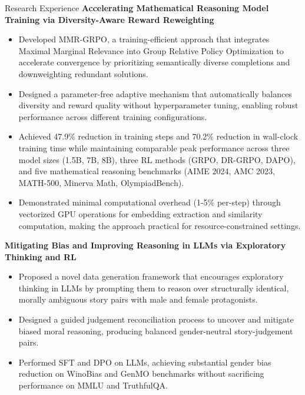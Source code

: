 \documentclass[a4paper, 12pt]{resume} %
\begin{document}
\begin{rSection}{Research Experience}
{\bf Accelerating Mathematical Reasoning Model Training via Diversity-Aware Reward Reweighting}
\begin{itemize}[noitemsep, topsep=0pt, leftmargin=*]
\item Developed MMR-GRPO, a training-efficient approach that integrates Maximal Marginal Relevance into Group Relative Policy Optimization to accelerate convergence by prioritizing semantically diverse completions and downweighting redundant solutions.
\item Designed a parameter-free adaptive mechanism that automatically balances diversity and reward quality without hyperparameter tuning, enabling robust performance across different training configurations.
\item Achieved 47.9\% reduction in training steps and 70.2\% reduction in wall-clock training time while maintaining comparable peak performance across three model sizes (1.5B, 7B, 8B), three RL methods (GRPO, DR-GRPO, DAPO), and five mathematical reasoning benchmarks (AIME 2024, AMC 2023, MATH-500, Minerva Math, OlympiadBench).
\item Demonstrated minimal computational overhead (1-5\% per-step) through vectorized GPU operations for embedding extraction and similarity computation, making the approach practical for resource-constrained settings.
\end{itemize}

{\bf Mitigating Bias and Improving Reasoning in LLMs via Exploratory Thinking and RL}
\begin{itemize}[noitemsep, topsep=0pt, leftmargin=*]
\item Proposed a novel data generation framework that encourages exploratory thinking in LLMs by prompting them to reason over structurally identical, morally ambiguous story pairs with male and female protagonists. 
\item Designed a guided judgement reconciliation process to uncover and mitigate biased moral reasoning, producing balanced gender-neutral story-judgement pairs. 
\item Performed SFT and DPO on LLMs, achieving substantial gender bias reduction on WinoBias and GenMO benchmarks without sacrificing performance on MMLU and TruthfulQA.
\end{itemize}



\end{rSection}
\end{document}

